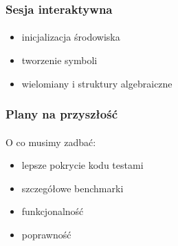 \documentclass[10pt]{beamer}
\begin{document}
\begin{frame}
    \frametitle{Sesja interaktywna}
    \framesubtitle{}

    \begin{itemize}
        \item inicjalizacja środowiska
        \item tworzenie symboli
        \item wielomiany i struktury algebraiczne
    \end{itemize}
\end{frame}

\begin{frame}
    \frametitle{Plany na przyszłość}
    \framesubtitle{}

    O co musimy zadbać:
    \begin{itemize}
        \item lepsze pokrycie kodu testami
        \item szczegółowe benchmarki
        \item funkcjonalność
        \item poprawność
    \end{itemize}
\end{frame}

\end{document}
